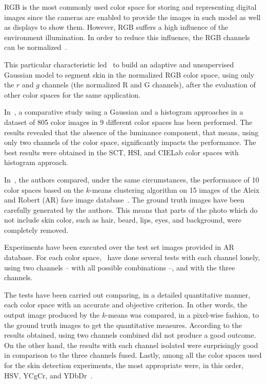 RGB is the most commonly used color space for storing and representing digital images since the cameras are enabled to provide the images in such model as well as displays to show them. However, RGB suffers a high influence of the environment illumination. In order to reduce this influence, the RGB channels can be normalized~\citep{kakumanu:07}.

This particular characteristic led~\citet{bergasa:00} to build an adaptive and unsupervised Gaussian model to segment skin in the normalized RGB color space, using only the $r$ and $g$ channels (the normalized R and G channels), after the evaluation of other color spaces for the same application.

In~\citet{jayaram:04}, a comparative study using a Gaussian and a histogram approaches in a dataset of 805 color images in 9 different color spaces has been performed. The results revealed that the absence of the luminance component, that means, using only two channels of the color space, significantly impacts the performance. The best results were obtained in the SCT, HSI, and CIELab color spaces with histogram approach.

In~\citet{chaves:10}, the authors compared, under the same circumstances, the performance of 10 color spaces based on the $k$-means clustering algorithm on 15 images of the Aleix and Robert (AR) face image database~\citep{ar-face-database:98}. The ground truth images have been carefully generated by the authors. This means that parts of the photo which do not include skin color, such as hair, beard, lips, eyes, and background, were completely removed.

Experiments have been executed over the test set images provided in AR database. For each color space, \citet{chaves:10}~have done several tests with each channel lonely, using two channels -- with all possible combinations --, and with the three channels.

The tests have been carried out comparing, in a detailed quantitative manner, each color space with an accurate and objective criterion. In other words, the output image produced by the $k$-means was compared, in a pixel-wise fashion, to the ground truth images to get the quantitative measures. According to the results obtained, using two channels combined did not produce a good outcome. On the other hand, the results with each channel isolated were surprisingly good in comparison to the three channels fused. Lastly, among all the color spaces used for the skin detection experiments, the most appropriate were, in this order, HSV, YCgCr, and YDbDr~\citep{chaves:10}.


